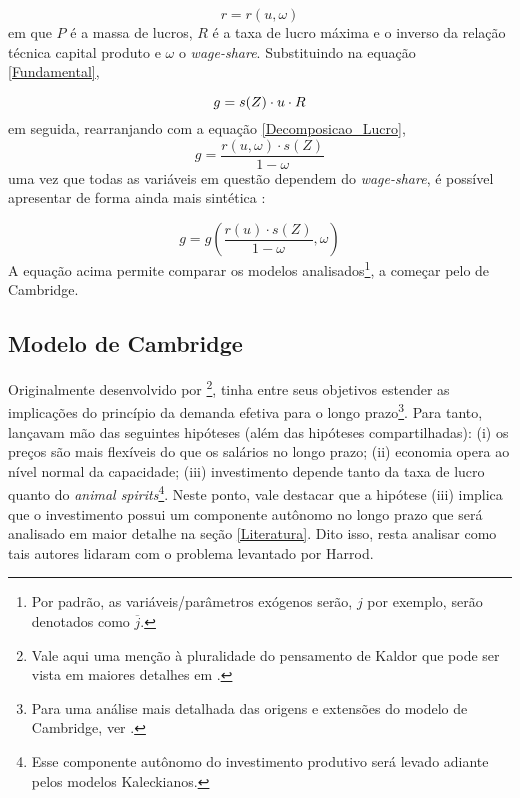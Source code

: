   \begin{equation}
  \label{Decomposicao_Lucro}
    r = r(u, \omega)  
  \end{equation}
  em que $P$ é a massa de lucros, $R$ é a taxa de lucro máxima e o inverso da relação técnica capital produto e $\omega$ o \textit{wage-share}. Substituindo na equação \ref{Fundamental},
  
$$
  g = s(Z)\cdot u \cdot R\\
$$
em seguida, rearranjando com a equação \ref{Decomposicao_Lucro},
\begin{equation}
g = \frac{r(u, \omega)\cdot s(Z)}{1-\omega}
\end{equation}
uma vez que todas as variáveis em questão dependem do \textit{wage-share}, é possível apresentar de forma ainda mais sintética :

\begin{equation}
\label{sintetica}
    g = g\left(\frac{r(u)\cdot s(Z)}{1 - \omega}, \omega \right)
\end{equation}
A equação acima permite comparar os modelos analisados\footnote{Por padrão, as variáveis/parâmetros exógenos serão, $j$ por exemplo, serão denotados como $\overline j$.}, a começar pelo de Cambridge.


\subsection{Modelo de Cambridge}


Originalmente desenvolvido por \textcite{kaldor_model_1957}\footnote{Vale aqui uma menção à pluralidade do pensamento de Kaldor que pode ser vista em maiores detalhes em \textcite{setterfield_kaldor_2010}.}, \textcites{robinson_model_1962}{pasinetti_rate_1962}
tinha entre seus objetivos estender as implicações do princípio da demanda efetiva para o longo prazo\footnote{Para uma análise mais detalhada das origens e extensões do modelo de Cambridge, ver \textcite{baranzini_cambridge_2013}.}. Para tanto, lançavam mão das seguintes hipóteses (além das hipóteses compartilhadas): (i) os preços são mais flexíveis do que os salários no longo prazo; (ii) economia opera ao nível normal da capacidade; (iii) investimento depende tanto da taxa de lucro quanto do \textit{animal spirits}\footnote{Esse componente autônomo do investimento produtivo será levado adiante pelos modelos Kaleckianos.}. Neste ponto, vale destacar que a hipótese (iii) implica que o investimento possui um componente autônomo no longo prazo que será analisado em maior detalhe na seção \ref{Literatura}. Dito isso, resta analisar como tais autores lidaram com o problema levantado por Harrod.

